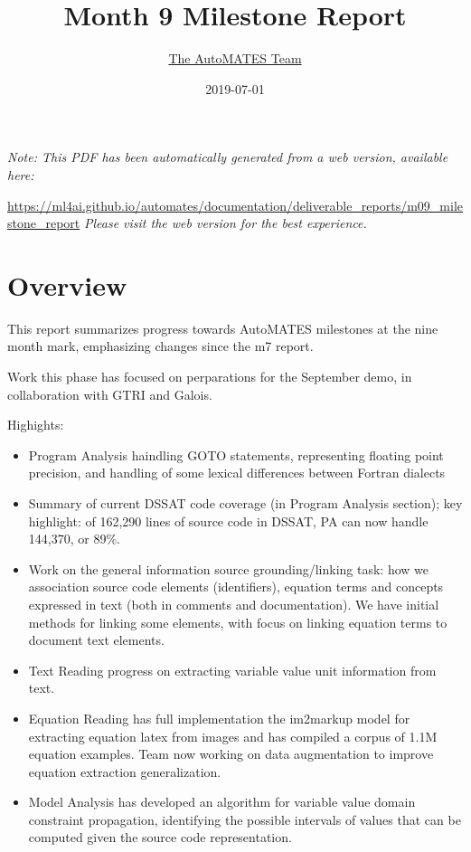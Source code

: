 \documentclass[article, 12pt, oneside]{memoir}
\title{Month 9 Milestone Report}
\author{\href{https://ml4ai.github.io/automates/team/}{The AutoMATES Team}}
\date{2019-07-01}
\begin{document}
\maketitle
\tableofcontents*

\bigskip
\bigskip

\noindent \emph{Note: This PDF has been automatically generated from a web
  version, available here:}

  {
  \small
\noindent
\url{https://ml4ai.github.io/automates/documentation/deliverable_reports/m09_milestone_report}
}
\emph{Please visit the web version for the best experience.}


\hypertarget{overview}{%
\section{Overview}\label{overview}}

This report summarizes progress towards AutoMATES milestones at the nine
month mark, emphasizing changes since the m7 report.

Work this phase has focused on perparations for the September demo, in
collaboration with GTRI and Galois.

Highights:

\begin{itemize}
\tightlist
\item
  Program Analysis haindling GOTO statements, representing floating
  point precision, and handling of some lexical differences between
  Fortran dialects
\item
  Summary of current DSSAT code coverage (in Program Analysis section);
  key highlight: of 162,290 lines of source code in DSSAT, PA can now
  handle 144,370, or 89\%.
\item
  Work on the general information source grounding/linking task: how we
  association source code elements (identifiers), equation terms and
  concepts expressed in text (both in comments and documentation). We
  have initial methods for linking some elements, with focus on linking
  equation terms to document text elements.
\item
  Text Reading progress on extracting variable value unit information
  from text.
\item
  Equation Reading has full implementation the im2markup model for
  extracting equation latex from images and has compiled a corpus of
  1.1M equation examples. Team now working on data augmentation to
  improve equation extraction generalization.
\item
  Model Analysis has developed an algorithm for variable value domain
  constraint propagation, identifying the possible intervals of values
  that can be computed given the source code representation.
\end{itemize}
\end{document}
